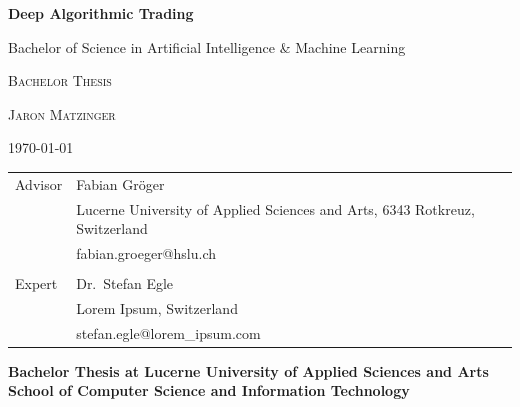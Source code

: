 \begin{titlepage}
    \centering
    {\small\text{\ }\par}
    \vspace{2cm}
    {\huge\bfseries 
    Deep Algorithmic Trading
    \par}
    \vspace{4cm}
    {\large\text Bachelor of Science in Artificial Intelligence \& Machine Learning \par
    \scshape\Large{Bachelor Thesis}\par
    }
    \vspace{1cm}
    {\large{}\par
        \scshape\Large Jaron Matzinger\par}
    \vspace{1cm}
    {\large{} \par
        \large{} \par
        \large{} \par}
    
    \vspace{4cm}
    {\large \today\par}
    \vfill
    \begin{tabular}[t]{l l}
            Advisor & 
            Fabian Gröger \\
            & Lucerne University of Applied Sciences and Arts, 6343 Rotkreuz, Switzerland \\
            & fabian.groeger@hslu.ch \\
            & \\
            
            Expert &
            Dr.\ Stefan Egle \\
            & Lorem Ipsum, Switzerland \\
            & stefan.egle@lorem\_ipsum.com \\
    
    \end{tabular}
    \vfill

    \clearpage

    \begin{flushleft}
        \vspace{2cm}
        {\Large \textbf{Bachelor Thesis at Lucerne University of Applied Sciences and Arts School of Computer Science and Information Technology} \par}
        \vspace{2cm}
        

\end{flushleft}
\end{titlepage}
